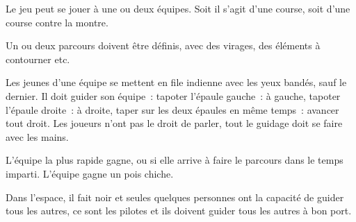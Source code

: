 \documentclass{grand-jeu}
\begin{document}
\begin{liste-materiel}
\end{liste-materiel}

\begin{regles}
Le jeu peut se jouer à une ou deux équipes. Soit il s’agit d’une course, soit d’une course contre la montre.

Un ou deux parcours doivent être définis, avec des virages, des éléments à contourner etc.

Les jeunes d’une équipe se mettent en file indienne avec les yeux bandés, sauf le dernier. Il doit guider son équipe : tapoter l’épaule gauche : à gauche, tapoter l’épaule droite : à droite, taper sur les deux épaules en même temps : avancer tout droit. Les joueurs n’ont pas le droit de parler, tout le guidage doit se faire avec les mains.

L’équipe la plus rapide gagne, ou si elle arrive à faire le parcours dans le temps imparti. L'équipe gagne un pois chiche.
\end{regles}

\begin{imaginaire}
Dans l’espace, il fait noir et seules quelques personnes ont la capacité de guider tous les autres, ce sont les pilotes et ils doivent guider tous les autres à bon port.
\end{imaginaire}

\begin{moments-stop}
\end{moments-stop}
\end{document}
